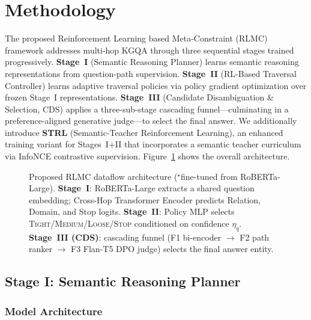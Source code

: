 \documentclass[10pt,conference]{IEEEtran}
\begin{document}

\section{Methodology}

The proposed Reinforcement Learning based Meta-Constraint (RLMC) framework addresses multi-hop KGQA through three sequential stages trained progressively. \textbf{Stage~I} (Semantic Reasoning Planner) learns semantic reasoning representations from question-path supervision. \textbf{Stage~II} (RL-Based Traversal Controller) learns adaptive traversal policies via policy gradient optimization over frozen Stage~I representations. \textbf{Stage~III} (Candidate Disambiguation \& Selection, CDS) applies a three-sub-stage cascading funnel—culminating in a preference-aligned generative judge—to select the final answer. We additionally introduce \textbf{STRL} (Semantic-Teacher Reinforcement Learning), an enhanced training variant for Stages~I+II that incorporates a semantic teacher curriculum via InfoNCE contrastive supervision. Figure~\ref{fig:arch} shows the overall architecture.

\begin{figure}[!t]
\centering

\caption{Proposed RLMC dataflow architecture ($^\star$fine-tuned from RoBERTa-Large). \textbf{Stage~I}: RoBERTa-Large extracts a shared question embedding; Cross-Hop Transformer Encoder predicts Relation, Domain, and Stop logits. \textbf{Stage~II}: Policy MLP selects \textsc{Tight}/\textsc{Medium}/\textsc{Loose}/\textsc{Stop} conditioned on confidence $\eta_q$. \textbf{Stage~III (CDS)}: cascading funnel (F1 bi-encoder $\to$ F2 path ranker $\to$ F3 Flan-T5 DPO judge) selects the final answer entity.}
\label{fig:arch}
\end{figure}

\subsection{Stage I: Semantic Reasoning Planner}

\subsubsection{Model Architecture}
\label{sec:stage1arch}
\end{document}
